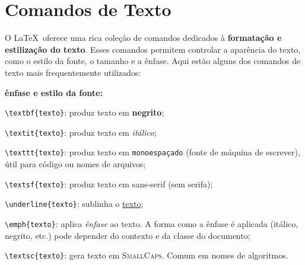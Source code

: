 \section{Comandos de Texto}

O \LaTeX\ oferece uma rica coleção de comandos dedicados à \textbf{formatação e estilização do texto}. Esses comandos permitem controlar a aparência do texto, como o estilo da fonte, o tamanho e a ênfase.
Aqui estão alguns dos comandos de texto mais frequentemente utilizados:

\begin{alineas}
	\item \textbf{ênfase e estilo da fonte:}
	\begin{alineas}
		\item \verb|\textbf{texto}|: produz texto em \textbf{negrito};
		\item \verb|\textit{texto}|: produz texto em \textit{itálico};
		\item \verb|\texttt{texto}|: produz texto em \texttt{monoespaçado} (fonte de máquina de escrever), útil para código ou nomes de arquivos;
		\item \verb|\textsf{texto}|: produz texto em \textsf{sans-serif} (sem serifa);
		\item \verb|\underline{texto}|: sublinha o \underline{texto};
		\item \verb|\emph{texto}|: aplica \emph{ênfase} ao texto. A forma como a ênfase é aplicada (itálico, negrito, etc.) pode depender do contexto e da classe do documento;
		\item \verb|\textsc{texto}|: gera texto em \textsc{SmallCaps}. Comum em nomes de algoritmos.
	\end{alineas}
	

\end{alineas}
